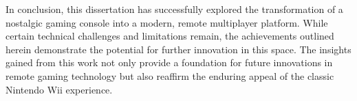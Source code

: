 In conclusion, this dissertation has successfully explored the transformation of
a nostalgic gaming console into a modern, remote multiplayer platform.  While
certain technical challenges and limitations remain, the achievements outlined
herein demonstrate the potential for further innovation in this space. The
insights gained from this work not only provide a foundation for future
innovations in remote gaming technology but also reaffirm the enduring appeal of
the classic Nintendo Wii experience.
